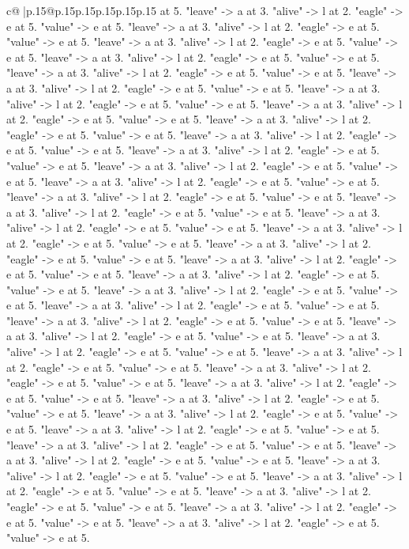 \documentclass{article}
\begin{document}
{\begin{supertabular}{c@{$\;$}|p{.15\linewidth}@{}p{.15\linewidth}p{.15\linewidth}p{.15\linewidth}p{.15\linewidth}p{.15\linewidth}}
{{{at 5. "leave" {-}> a at 3. "alive" {-}> l at 2. "eagle" {-}> e at 5. "value" {-}> e at 5. "leave" {-}> a at 3. "alive" {-}> l at 2. "eagle" {-}> e at 5. "value" {-}> e at 5. "leave" {-}> a at 3. "alive" {-}> l at 2. "eagle" {-}> e at 5. "value" {-}> e at 5. "leave" {-}> a at 3. "alive" {-}> l at 2. "eagle" {-}> e at 5. "value" {-}> e at 5. "leave" {-}> a at 3. "alive" {-}> l at 2. "eagle" {-}> e at 5. "value" {-}> e at 5. "leave" {-}> a at 3. "alive" {-}> l at 2. "eagle" {-}> e at 5. "value" {-}> e at 5. "leave" {-}> a at 3. "alive" {-}> l at 2. "eagle" {-}> e at 5. "value" {-}> e at 5. "leave" {-}> a at 3. "alive" {-}> l at 2. "eagle" {-}> e at 5. "value" {-}> e at 5. "leave" {-}> a at 3. "alive" {-}> l at 2. "eagle" {-}> e at 5. "value" {-}> e at 5. "leave" {-}> a at 3. "alive" {-}> l at 2. "eagle" {-}> e at 5. "value" {-}> e at 5. "leave" {-}> a at 3. "alive" {-}> l at 2. "eagle" {-}> e at 5. "value" {-}> e at 5. "leave" {-}> a at 3. "alive" {-}> l at 2. "eagle" {-}> e at 5. "value" {-}> e at 5. "leave" {-}> a at 3. "alive" {-}> l at 2. "eagle" {-}> e at 5. "value" {-}> e at 5. "leave" {-}> a at 3. "alive" {-}> l at 2. "eagle" {-}> e at 5. "value" {-}> e at 5. "leave" {-}> a at 3. "alive" {-}> l at 2. "eagle" {-}> e at 5. "value" {-}> e at 5. "leave" {-}> a at 3. "alive" {-}> l at 2. "eagle" {-}> e at 5. "value" {-}> e at 5. "leave" {-}> a at 3. "alive" {-}> l at 2. "eagle" {-}> e at 5. "value" {-}> e at 5. "leave" {-}> a at 3. "alive" {-}> l at 2. "eagle" {-}> e at 5. "value" {-}> e at 5. "leave" {-}> a at 3. "alive" {-}> l at 2. "eagle" {-}> e at 5. "value" {-}> e at 5. "leave" {-}> a at 3. "alive" {-}> l at 2. "eagle" {-}> e at 5. "value" {-}> e at 5. "leave" {-}> a at 3. "alive" {-}> l at 2. "eagle" {-}> e at 5. "value" {-}> e at 5. "leave" {-}> a at 3. "alive" {-}> l at 2. "eagle" {-}> e at 5. "value" {-}> e at 5. "leave" {-}> a at 3. "alive" {-}> l at 2. "eagle" {-}> e at 5. "value" {-}> e at 5. "leave" {-}> a at 3. "alive" {-}> l at 2. "eagle" {-}> e at 5. "value" {-}> e at 5. "leave" {-}> a at 3. "alive" {-}> l at 2. "eagle" {-}> e at 5. "value" {-}> e at 5. "leave" {-}> a at 3. "alive" {-}> l at 2. "eagle" {-}> e at 5. "value" {-}> e at 5. "leave" {-}> a at 3. "alive" {-}> l at 2. "eagle" {-}> e at 5. "value" {-}> e at 5. "leave" {-}> a at 3. "alive" {-}> l at 2. "eagle" {-}> e at 5. "value" {-}> e at 5. "leave" {-}> a at 3. "alive" {-}> l at 2. "eagle" {-}> e at 5. "value" {-}> e at 5. "leave" {-}> a at 3. "alive" {-}> l at 2. "eagle" {-}> e at 5. "value" {-}> e at 5. "leave" {-}> a at 3. "alive" {-}> l at 2. "eagle" {-}> e at 5. "value" {-}> e at 5. "leave" {-}> a at 3. "alive" {-}> l at 2. "eagle" {-}> e at 5. "value" {-}> e at 5. "leave" {-}> a at 3. "alive" {-}> l at 2. "eagle" {-}> e at 5. "value" {-}> e at 5. "leave" {-}> a at 3. "alive" {-}> l at 2. "eagle" {-}> e at 5. "value" {-}> e at 5. "leave" {-}> a at 3. "alive" {-}> l at 2. "eagle" {-}> e at 5. "value" {-}> e at 5. "leave" {-}> a at 3. "alive" {-}> l at 2. "eagle" {-}> e at 5. "value" {-}> e at 5. "leave" {-}> a at 3. "alive" {-}> l at 2. "eagle" {-}> e at 5. "value" {-}> e at 5. "leave" {-}> a at 3. "alive" {-}> l at 2. "eagle" {-}> e at 5. "value" {-}> e at 5. }}}
\end{supertabular}}
\end{document}
